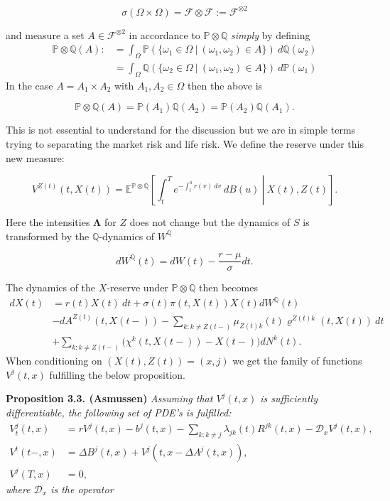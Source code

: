 \documentclass[a4paper,10pt,openany]{book}
\begin{document}
\[
\sigma(\Omega\times\Omega)=\mathcal F \otimes \mathcal F:=\mathcal F^{\otimes2}
\]

and measure a set \(A\in \mathcal F^{\otimes2}\) in accordance to \(\mathbb P\otimes \mathbb Q\) \emph{simply} by defining
\begin{align*}
\mathbb P\otimes \mathbb Q(A):&=\int_\Omega \mathbb P(\{\omega_1 \in \Omega\ \vert\ (\omega_1,\omega_2) \in A\})\ d\mathbb Q(\omega_2)\\
&=\int_\Omega \mathbb Q(\{\omega_2 \in \Omega\ \vert\ (\omega_1,\omega_2) \in A\})\ d\mathbb P(\omega_1)
\end{align*}
In the case \(A=A_1\times A_2\) with \(A_1,A_2\in \Omega\) then the above is

\[
\mathbb P\otimes \mathbb Q(A)=\mathbb P(A_1)\mathbb Q(A_2)=\mathbb P(A_2)\mathbb Q(A_1).
\]

This is not essential to understand for the discussion but we are in simple terms trying to separating the market risk and life risk. We define the reserve under this new measure:

\[
V^{Z(t)}(t,X(t))=\mathbb E^{\mathbb P\otimes\mathbb Q}\left[\left. \int_t^Te^{-\int_t^u r(v)\ dv}\ dB(u)\ \right\vert\ X(t),Z(t)\right].
\]

Here the intensities \(\mathbf \Lambda\) for \(Z\) does not change but the dynamics of \(S\) is transformed by the \(\mathbb Q\)-dynamics of \(W^\mathbb Q\)

\[
dW^\mathbb Q(t)=dW(t)-\frac{r-\mu}{\sigma}dt.
\]

The dynamics of the \(X\)-reserve under \(\mathbb P\otimes \mathbb Q\) then becomes
\begin{align*}
dX(t)&=r(t)X(t)\ dt+\sigma(t)\pi(t,X(t))X(t)dW^\mathbb Q(t)\\
&-dA^{Z(t)}(t,X(t-))-\sum_{k:k\ne Z(t-)}\mu_{Z(t)k}(t) \varrho^{Z(t)k}(t,X(t))\ dt\\
&+\sum_{k:k\ne Z(t-)}\Big(\chi^k(t,X(t-))-X(t-)\Big)dN^k(t).
\end{align*}
When conditioning on \((X(t),Z(t))=(x,j)\) we get the family of functions \(V^j(t,x)\) fulfilling the below proposition.

\textbf{Proposition 3.3. (Asmussen)} \emph{Assuming that \(V^j(t,x)\) is sufficiently differentiable, the following set of PDE's is fulfilled:}
\begin{align*}
V_t^j(t,x)&=rV^j(t,x)-b^j(t,x)-\sum_{k:k\ne j}\lambda_{jk}(t)R^{jk}(t,x)-\mathcal D_x V^j(t,x),\\
V^t(t-,x)&=\Delta B^j(t,x)+V^j(t,x-\Delta A^j(t,x)),\\
V^j(T,x)&=0,
\end{align*}
\emph{where \(\mathcal D_x\) is the operator}
\end{document}

